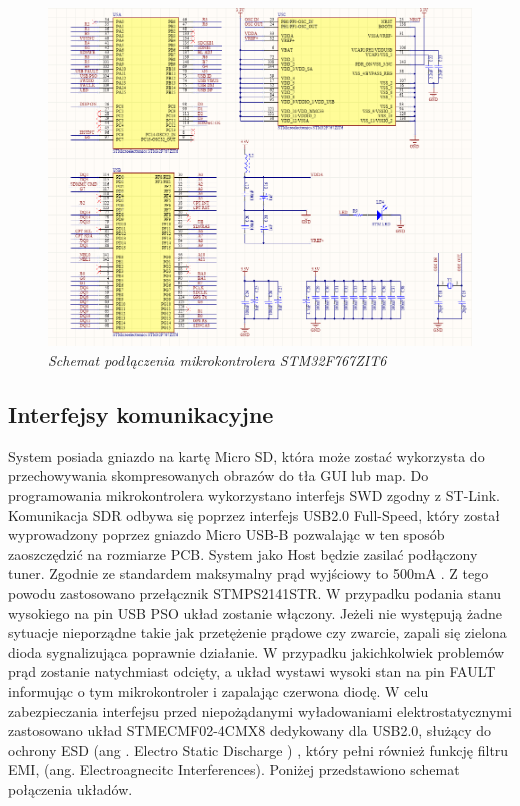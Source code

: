 \documentclass[eng,printmode]{mgr}
\begin{document}
\begin{figure}[!h]
    \centering
    \includegraphics[height=\textwidth, angle=90]{schematics/uC.png}
    \caption{\textit{Schemat podłączenia mikrokontrolera STM32F767ZIT6}}
\end{figure}

\subsection*{Interfejsy komunikacyjne}
System posiada gniazdo na kartę Micro SD, która może zostać wykorzysta do przechowywania skompresowanych obrazów do tła GUI lub map. Do programowania mikrokontrolera wykorzystano interfejs SWD zgodny z ST-Link. Komunikacja SDR odbywa się poprzez interfejs USB2.0 Full-Speed, który został wyprowadzony poprzez gniazdo Micro USB-B pozwalając w ten sposób zaoszczędzić na rozmiarze PCB. System jako Host będzie zasilać podłączony tuner. Zgodnie ze standardem maksymalny prąd wyjściowy to 500mA \cite{usbSpec}. Z tego powodu zastosowano przełącznik STMPS2141STR. W przypadku podania stanu wysokiego na pin USB PSO układ zostanie włączony. Jeżeli nie występują żadne sytuacje nieporządne takie jak przetężenie prądowe czy zwarcie, zapali się zielona dioda sygnalizująca poprawnie działanie. W przypadku jakichkolwiek problemów prąd zostanie natychmiast odcięty, a układ wystawi wysoki stan na pin FAULT informując o tym mikrokontroler i zapalając czerwona diodę. W celu zabezpieczania interfejsu przed niepożądanymi wyładowaniami elektrostatycznymi zastosowano układ STMECMF02-4CMX8 dedykowany dla USB2.0, służący do ochrony ESD (ang . Electro Static Discharge ) , który pełni również funkcję filtru EMI, (ang. Electroagnecitc Interferences). Poniżej przedstawiono schemat połączenia układów.
\end{document}
